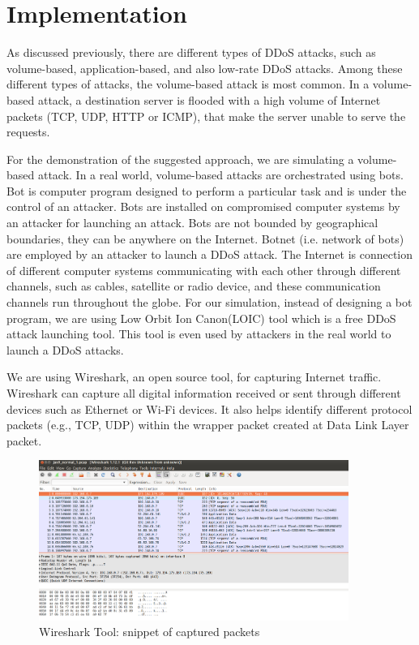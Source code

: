 \documentclass[12pt,oneside,a4paper]{article}
\begin{document}
\pagebreak

\section{Implementation} \label{sec:Implementation}

As discussed previously, there are different types of DDoS attacks, such as volume-based, application-based, and also low-rate DDoS attacks. Among these different types of attacks, the volume-based attack is most common. In a volume-based attack, a destination server is flooded with a high volume of Internet packets (TCP, UDP, HTTP or ICMP), that make the server unable to serve the requests.

For the demonstration of the suggested approach, we are simulating a volume-based attack. In a real world, volume-based attacks are orchestrated using bots. Bot\cite{bot} is computer program designed to perform a particular task and is under the control of an attacker. Bots are installed on compromised computer systems by an attacker for launching an attack. Bots are not bounded by geographical boundaries, they can be anywhere on the Internet. Botnet (i.e. network of bots) are employed by an attacker to launch a DDoS attack. The Internet is connection of different computer systems communicating with each other through different channels, such as cables, satellite or radio device, and these communication channels run throughout the globe. For our simulation, instead of designing a bot program, we are using Low Orbit Ion Canon(LOIC) tool which is a free DDoS attack launching tool. This tool is even used by attackers in the real world to launch a DDoS attacks.

We are using Wireshark, an open source tool, for capturing Internet traffic. Wireshark can capture all digital information received or sent through different devices such as Ethernet or Wi-Fi devices. It also helps identify different protocol packets (e.g., TCP, UDP) within the wrapper packet created at Data Link Layer packet.\par

\begin{figure}[H]
\centering
\includegraphics[width=0.90\textwidth]{Wireshark_Tools.png}
\caption{Wireshark Tool: snippet of captured packets} \label{fig:wireshark}
\end{figure}
\end{document}

